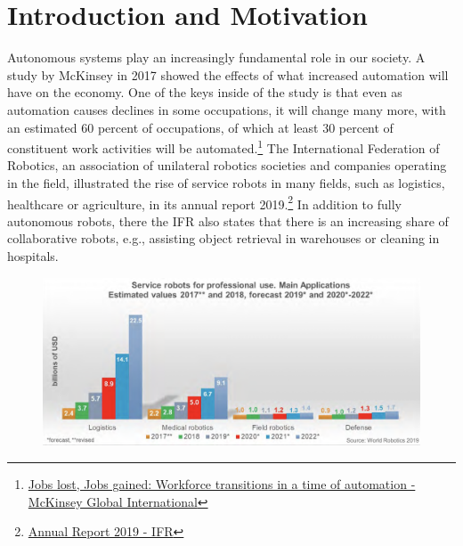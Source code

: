 \chapter{Introduction and Motivation}
\label{text:introduction}
Autonomous systems play an increasingly fundamental role in our society. A study by McKinsey in 2017 showed the effects of what increased automation will have on the economy. One of the keys inside of the study is that even as automation causes declines in some occupations, it will change many more, with an estimated 60 percent of occupations, of which at least 30 percent of constituent work activities will be automated.\footnote{\href{https://www.mckinsey.com/~/media/McKinsey/Featured\%20Insights/Future\%20of\%20Organizations/What\%20the\%20future\%20of\%20work\%20will\%20mean\%20for\%20jobs\%20skills\%20and\%20wages/MGI-Jobs-Lost-Jobs-Gained-Report-December-6-2017.ashx}{Jobs lost, Jobs gained: Workforce transitions in a time of automation - McKinsey Global International}} The International Federation of Robotics, an association of unilateral robotics societies and companies operating in the field, illustrated the rise of service robots in many fields, such as logistics, healthcare or agriculture, in its annual report 2019.\footnote{\href{https://ifr.org/downloads/press2018/IFR\%20World\%20Robotics\%20Presentation\%20-\%2018\%20Sept\%202019.pdf}{Annual Report 2019 - IFR}} In addition to fully autonomous robots, there the IFR also states that there is an increasing share of collaborative robots, e.g., assisting object retrieval in warehouses or cleaning in hospitals.

\begin{figure}[!ht]
\begin{center}
\includegraphics[width=\imgwidth]{images/service_robotics.png}
\label{img:service_robotics}
\end{center}
\end{figure}

